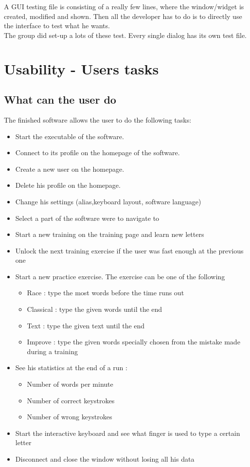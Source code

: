A GUI testing file is consisting of a really few lines, where the window/widget is created, modified and shown. Then all the developer has to do is to directly use the interface to test what he wants.\\
The group did set-up a lots of these test. Every single dialog has its own test file.

\part{Usability - Users tasks}

\chapter{What can the user do}
The finished software allows the user to do the following tasks:
\begin{itemize}
	\item Start the executable of the software.
	\item Connect to its profile on the homepage of the software.
	\item Create a new user on the homepage.
	\item Delete his profile on the homepage.
	\item Change his settings (alias,keyboard layout, software language)
	\item Select a part of the software were to navigate to
	\item Start a new training on the training page and learn new letters
	\item Unlock the next training exercise if the user was fast enough at the previous one
	\item Start a new practice exercise. The exercise can be one of the following 
	\begin{itemize}
		\item Race : type the most words before the time runs out
		\item Classical : type the given words until the end
		\item Text : type the given text until the end
		\item Improve : type the given words specially chosen from the mistake made during a training
	\end{itemize}
	\item See his statistics at the end of a run :
	\begin{itemize}
		\item Number of words per minute
		\item Number of correct keystrokes
		\item Number of wrong keystrokes
	\end{itemize}
	\item Start the interactive keyboard and see what finger is used to type a certain letter
	\item Disconnect and close the window without losing all his data
\end{itemize}



